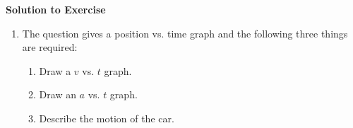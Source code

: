 {\begin{mdframed}[linewidth=4, leftmargin=40, rightmargin=40]
\begin{exercise}
      \vspace{5pt}
      \label{m38795*solfhsst!!!underscore!!!id3435}\noindent\textbf{Solution to Exercise } \label{m38795*listfhsst!!!underscore!!!id3435}\begin{enumerate}[noitemsep, label=\textbf{Step} \textbf{\arabic*}. ] 
            \leftskip=20pt\rightskip=\leftskip\item  
      \label{m38795*id73362}The question gives a position vs. time graph and the following three things are required:\par 
      \label{m38795*id73366}\begin{enumerate}[noitemsep, label=\textbf{\alph*}. ] 
            \leftskip=20pt\rightskip=\leftskip\label{m38795*uid124}\item Draw a \begin{math}v\end{math} vs. \begin{math}t\end{math} graph.
\label{m38795*uid125}\item Draw an \begin{math}a\end{math} vs. \begin{math}t\end{math} graph.
\label{m38795*uid126}\item Describe the motion of the car.
\end{enumerate}
        

\end{enumerate}
\end{exercise}
\end{mdframed}}
